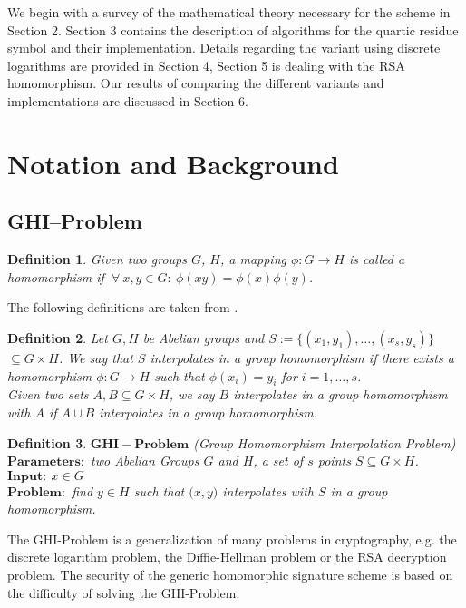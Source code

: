 \documentclass[a4paper, 11pt]{article}
\newtheorem{defi}{Definition}[section]
\begin{document}
 We begin with a survey of the mathematical theory necessary for the scheme in Section 2. Section 3 contains the description of algorithms for the quartic residue symbol and their implementation. Details regarding the variant using discrete logarithms are provided in Section 4, Section  5 is dealing with the RSA homomorphism. Our results of comparing the different variants and 
 implementations are discussed in Section 6. 
 
 
 \section{Notation and Background} 
 \subsection{GHI--Problem} 
 \begin{defi} 
 \emph{Given two groups $G$, $H$, a mapping $\phi : G \to H$ is called a \emph{ 
 homomorphism} if $~\forall~ x,y \in G: ~\phi (xy) = \phi (x) \phi (y)$.} 
 \end{defi} 
 
 The following definitions are taken from \cite{genMOVA}. 
 \begin{defi} 
 \emph{Let $G, H$ be Abelian groups and $S := \{(x_{1},y_{1}),\ldots,(x_{s},y_{s})\}$ $ \subseteq G\times H$. We say that $S$ \emph{interpolates in a group homomorphism} 
 if there exists a homomorphism $\phi : G \to H$ such that $\phi (x_{i}) = y_{i}$ for $i = 1, \ldots, s$.\\  
 Given two sets $A,B\subseteq G\times H$, we say $B$ \emph{interpolates in a group homomorphism with $A$} if $A \cup B$ interpolates in a group homomorphism. 
 }\end{defi} 
 
 \begin{defi} 
 \emph{$\mathbf{GHI-Problem}$ \big(Group Homomorphism Interpolation Problem\big)\\ 
 $\mathbf{Parameters:}$ two Abelian Groups $G$ and $H$, a set of $s$ points $S \subseteq G \times H$. 
 $\mathbf{Input:} ~x \in G$\\ 
 $\mathbf{Problem:}$ find $y \in H$ such that $\big( x,y\big)$ interpolates with $S$ in a group 
 homomorphism.}\end{defi} 
 
 The GHI-Problem is a generalization of many problems in cryptography, e.g. the discrete logarithm problem, the Diffie-Hellman problem or the RSA decryption problem. The security of the generic homomorphic signature scheme is based  on the difficulty of solving the GHI-Problem. 
 
\end{document}
